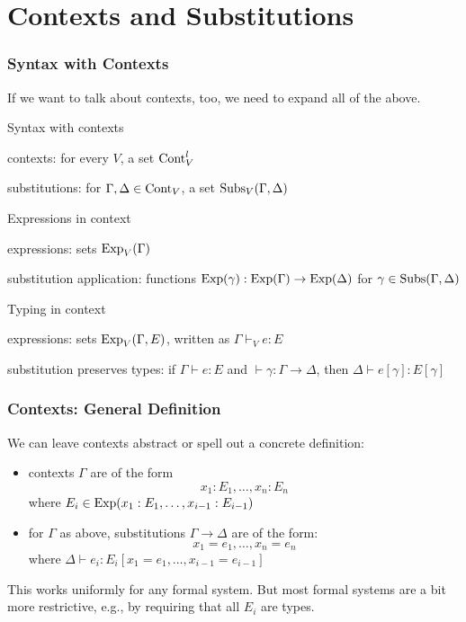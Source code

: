 \section{Contexts and Substitutions}

\begin{frame}\frametitle{Syntax with Contexts}
If we want to talk about contexts, too, we need to expand all of the above.

\begin{blockitems}{Syntax with contexts}
\item contexts: for every $V$, a set $\mathrm{Cont}^l_V$
\item substitutions: for $\Gamma,\Delta\in\mathrm{Cont}_V$, a set $\mathrm{Subs}_V(\Gamma,\Delta)$
\end{blockitems}

\begin{blockitems}{Expressions in context}
\item expressions: sets $\mathrm{Exp}_V(\Gamma)$
\item substitution application: functions $\mathrm{Exp}(\gamma):\mathrm{Exp}(\Gamma)\to\mathrm{Exp}(\Delta)$ for $\gamma\in\mathrm{Subs}(\Gamma,\Delta)$
\end{blockitems}

\begin{blockitems}{Typing in context}
\item expressions: sets $\mathrm{Exp}_V(\Gamma,E)$, written as $\Gamma\vdash_V e: E$
\item substitution preserves types: if $\Gamma\vdash e:E$ and $\vdash \gamma:\Gamma\to\Delta$, then $\Delta\vdash e[\gamma]:E[\gamma]$
\end{blockitems}
\end{frame}

\begin{frame}\frametitle{Contexts: General Definition}
We can leave contexts abstract or spell out a concrete definition:
\begin{itemize}
\item contexts $\Gamma$ are of the form \[x_1:E_1,\ldots,x_n:E_n\]
 where $E_i\in\mathrm{Exp}(x_1:E_1,\ldots,x_{i-1}:E_{i-1})$
\item for $\Gamma$ as above, substitutions $\Gamma\to \Delta$ are of the form: \[x_1=e_1,\ldots,x_n=e_n\]
 where $\Delta\vdash e_i: E_i[x_1=e_1,\ldots,x_{i-1}=e_{i-1}]$
\end{itemize}
\medskip

This works uniformly for any formal system.
But most formal systems are a bit more restrictive, e.g., by requiring that all $E_i$ are types.
\end{frame}

